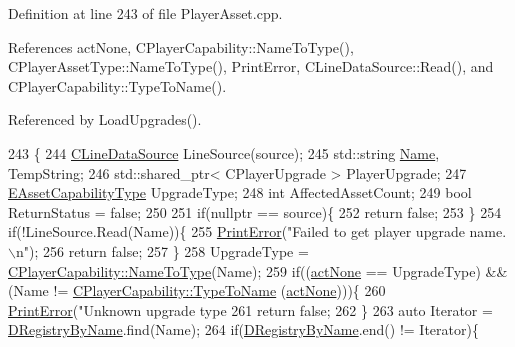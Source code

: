 Definition at line 243 of file Player\+Asset.\+cpp.



References act\+None, C\+Player\+Capability\+::\+Name\+To\+Type(), C\+Player\+Asset\+Type\+::\+Name\+To\+Type(), Print\+Error, C\+Line\+Data\+Source\+::\+Read(), and C\+Player\+Capability\+::\+Type\+To\+Name().



Referenced by Load\+Upgrades().


\begin{DoxyCode}
243                                                             \{
244     \hyperlink{classCLineDataSource}{CLineDataSource} LineSource(source);
245     std::string \hyperlink{classCPlayerUpgrade_a9030c62bc29150957f2fb6485ee9c01f}{Name}, TempString;
246     std::shared\_ptr< CPlayerUpgrade > PlayerUpgrade;
247     \hyperlink{GameDataTypes_8h_a35b98ce26aca678b03c6f9f76e4778ce}{EAssetCapabilityType} UpgradeType;
248     \textcolor{keywordtype}{int} AffectedAssetCount;
249     \textcolor{keywordtype}{bool} ReturnStatus = \textcolor{keyword}{false};
250     
251     \textcolor{keywordflow}{if}(\textcolor{keyword}{nullptr} == source)\{
252         \textcolor{keywordflow}{return} \textcolor{keyword}{false};   
253     \}
254     \textcolor{keywordflow}{if}(!LineSource.Read(Name))\{
255         \hyperlink{Debug_8h_a2ed825eefefe35baf59a93a8c641323d}{PrintError}(\textcolor{stringliteral}{"Failed to get player upgrade name.\(\backslash\)n"});
256         \textcolor{keywordflow}{return} \textcolor{keyword}{false};
257     \}
258     UpgradeType = \hyperlink{classCPlayerCapability_a920a696526e8a839f728192aea0ba1c5}{CPlayerCapability::NameToType}(Name);
259     \textcolor{keywordflow}{if}((\hyperlink{GameDataTypes_8h_a35b98ce26aca678b03c6f9f76e4778ceaa8df154ad276f6f62054e9b5b0696f92}{actNone} == UpgradeType) && (Name != \hyperlink{classCPlayerCapability_a976f05b7e620b721bdb5051debc9b93d}{CPlayerCapability::TypeToName}
      (\hyperlink{GameDataTypes_8h_a35b98ce26aca678b03c6f9f76e4778ceaa8df154ad276f6f62054e9b5b0696f92}{actNone})))\{
260         \hyperlink{Debug_8h_a2ed825eefefe35baf59a93a8c641323d}{PrintError}(\textcolor{stringliteral}{"Unknown upgrade type %
261         \textcolor{keywordflow}{return} \textcolor{keyword}{false};
262     \}
263     \textcolor{keyword}{auto} Iterator = \hyperlink{classCPlayerUpgrade_a33e022bd67ce2f4d9ce83dfd0b7289f6}{DRegistryByName}.find(Name);
264     \textcolor{keywordflow}{if}(\hyperlink{classCPlayerUpgrade_a33e022bd67ce2f4d9ce83dfd0b7289f6}{DRegistryByName}.end() != Iterator)\{
}
\end{DoxyCode}
